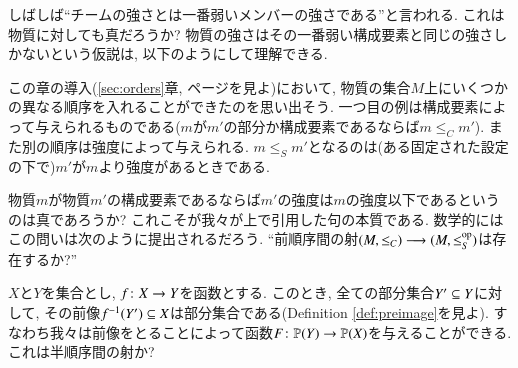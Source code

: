 \begin{application}


しばしば``チームの強さとは一番弱いメンバーの強さである''と言われる. これは物質に対しても真だろうか? 物質の強さはその一番弱い構成要素と同じの強さしかないという仮説は, 以下のようにして理解できる. 


この章の導入(\ref{sec:orders}章, \pageref{sec:orders}ページを見よ)において, 物質の集合$M$上にいくつかの異なる順序を入れることができたのを思い出そう. 一つ目の例は構成要素によって与えられるものである($m$が$m'$の部分か構成要素であるならば$m\leq_C m'$). また別の順序は強度によって与えられる. $m\leq_S m'$となるのは(ある固定された設定の下で)$m'$が$m$より強度があるときである.


物質$m$が物質$m'$の構成要素であるならば$m'$の強度は$m$の強度以下であるというのは真であろうか? これこそが我々が上で引用した句の本質である. 数学的にはこの問いは次のように提出されるだろう. ``前順序間の射$(M,\leq_C)\too(M,\leq_S\op)$は存在するか?''

\end{application}

\begin{exercise}
$X$と$Y$を集合とし, $f\taking X\to Y$を函数とする. このとき, 全ての部分集合$Y'\ss Y$に対して, その前像$f^\m1(Y')\ss X$は部分集合である(Definition \ref{def:preimage}を見よ). すなわち我々は前像をとることによって函数$F\taking\PP(Y)\to\PP(X)$を与えることができる. これは半順序間の射か?
\end{exercise}

